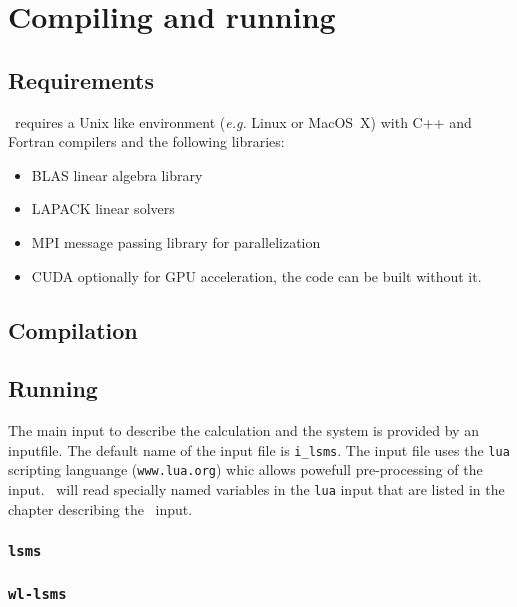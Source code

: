 \chapter{Compiling and running \LSMS}
\section{Requirements}
\LSMS\ requires a Unix like environment (\textit{e.g.}
Linux or MacOS~X) with C++ and Fortran compilers and the following libraries:
\begin{itemize}
\item BLAS linear algebra library
\item LAPACK linear solvers
\item MPI message passing library for parallelization
\item CUDA optionally for GPU acceleration, the code can be built without it.
\end{itemize}

\section{Compilation}

\section{Running}

The main input to describe the calculation and the system is provided by an
inputfile. The default name of the input file is \texttt{i\_lsms}.
The input file uses the \texttt{lua} scripting languange (\texttt{www.lua.org}) whic allows
powefull pre-processing of the input.
\LSMS\ will read specially named variables in the \texttt{lua} input that are listed in the chapter describing
the \LSMS\ input.

\subsection{\texttt{lsms}}

\subsection{\texttt{wl-lsms}}
